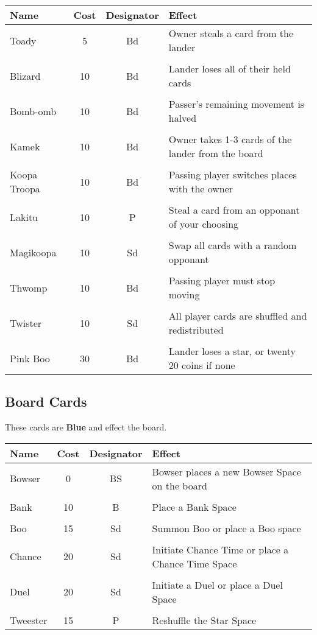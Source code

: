 \documentclass{article}
\begin{document}
\begin{tabular}{lccl}
\textbf{Name} & \textbf{Cost} & \textbf{Designator} & \textbf{Effect} \\
\hline
Toady & 5 & Bd & Owner steals a card from the lander \\
&&& \\
Blizard & 10 & Bd & Lander loses all of their held cards \\
&&& \\
Bomb-omb & 10 & Bd & Passer's remaining movement is halved \\
&&& \\
Kamek & 10 & Bd & Owner takes 1-3 cards of the lander from the board \\
&&& \\
Koopa Troopa & 10 & Bd & Passing player switches places with the owner \\
&&& \\
Lakitu & 10 & P & Steal a card from an opponant of your choosing \\
&&& \\
Magikoopa & 10 & Sd & Swap all cards with a random opponant \\
&&& \\
Thwomp & 10 & Bd & Passing player must stop moving \\
&&& \\
Twister & 10 & Sd & All player cards are shuffled and redistributed \\
&&& \\
Pink Boo & 30 & Bd & Lander loses a star, or twenty 20 coins if none \\
\end{tabular}

\subsection{Board Cards}

These cards are \textbf{Blue} and effect the board.
\vspace*{2ex}

\begin{tabular}{lccl}
\textbf{Name} & \textbf{Cost} & \textbf{Designator} & \textbf{Effect} \\
\hline
Bowser & 0 & BS & Bowser places a new Bowser Space on the board \\
&&& \\
Bank & 10 & B & Place a Bank Space \\
&&& \\
Boo & 15 & Sd & Summon Boo or place a Boo space \\
&&& \\
Chance & 20 & Sd & Initiate Chance Time or place a Chance Time Space \\
&&& \\
Duel & 20 & Sd & Initiate a Duel or place a Duel Space \\
&&& \\
Tweester & 15 & P & Reshuffle the Star Space \\
\end{tabular}
\end{document}

